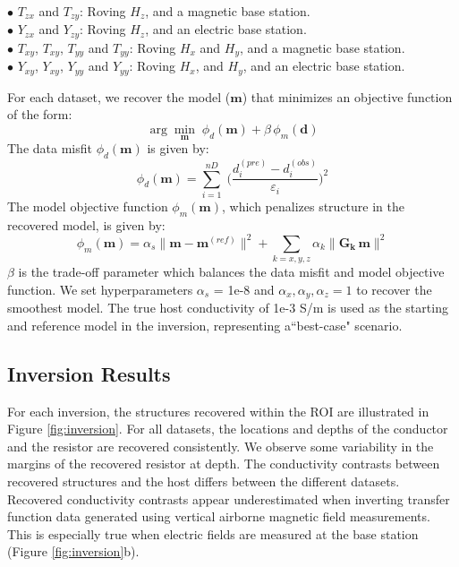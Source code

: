 \documentclass{segabs}
\begin{document}
$\bullet$ $T_{zx}$ and $T_{zy}$: Roving $H_z$, and a magnetic base station.\\
$\bullet$ $Y_{zx}$ and $Y_{zy}$: Roving $H_z$, and an electric base station.\\
$\bullet$ $T_{xy}$, $T_{xy}$, $T_{yy}$ and $T_{yy}$: Roving $H_x$ and $H_y$, and a magnetic base station. \\
$\bullet$ $Y_{xy}$, $Y_{xy}$, $Y_{yy}$ and $Y_{yy}$: Roving $H_x$, and $H_y$, and an electric base station.

For each dataset, we recover the model ($\mathbf{m}$) that minimizes an objective function of the form:
\begin{equation}
\arg \min_\mathbf{m} \; \phi_d (\mathbf{m}) + \beta \, \phi_m (\mathbf{d})
\end{equation}
The data misfit $\phi_d (\mathbf{m})$ is given by:
\begin{equation}
\phi_d (\mathbf{m}) = \sum_{i=1}^{nD} \; \Bigg ( \frac{d_i^{(pre)} - d_i^{(obs)} }{\varepsilon_i} \Bigg )^2
\end{equation}
The model objective function $\phi_m (\mathbf{m})$, which penalizes structure in the recovered model, is given by:
\begin{equation}
\phi_m (\mathbf{m}) = \alpha_s \big \| \mathbf{m - m}^{(ref)} \big \|^2 + \sum_{k=x,y,z} \alpha_k \big \| \mathbf{G_k \, m} \big \|^2
\end{equation}
$\beta$ is the trade-off parameter which balances the data misfit and model objective function. We set hyperparameters $\alpha_s$ = 1e-8 and $\alpha_x,\alpha_y, \alpha_z=1$ to recover the smoothest model. The true host conductivity of 1e-3 S/m is used as the starting and reference model in the inversion, representing a``best-case" scenario.

\subsection{Inversion Results}

For each inversion, the structures recovered within the ROI are illustrated in Figure \ref{fig:inversion}. For all datasets, the locations and depths of the conductor and the resistor are recovered consistently. We observe some variability in the margins of the recovered resistor at depth. The conductivity contrasts between recovered structures and the host differs between the different datasets. Recovered conductivity contrasts appear underestimated when inverting transfer function data generated using vertical airborne magnetic field measurements. This is especially true when electric fields are measured at the base station (Figure \ref{fig:inversion}b).
\end{document}
